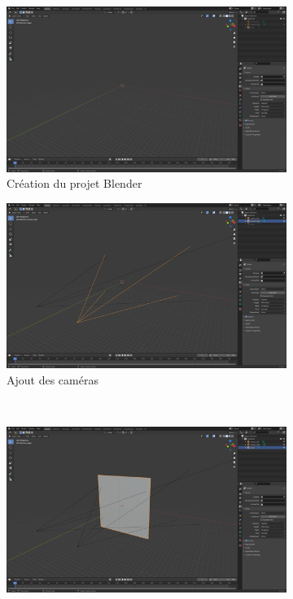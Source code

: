 \documentclass[a4paper, 11pt]{article}
\begin{document}
		\begin{figure}\centering
			\begin{subfigure}[c]{.48\textwidth}
				\includegraphics[width=\textwidth]{screen_0_resized.png}
				\caption{Création du projet Blender}
			\end{subfigure}\hfill
			\begin{subfigure}[c]{.48\textwidth}
				\includegraphics[width=\textwidth]{screen_2_resized.png}
				\caption{Ajout des caméras}
			\end{subfigure}\\
			\begin{subfigure}[c]{.48\textwidth}
				\includegraphics[width=\textwidth]{screen_3_resized.png}

\end{subfigure}
\end{figure}
\end{document}
